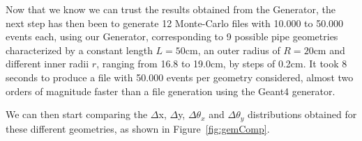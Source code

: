 \documentclass[a4paper, 11pt, twoside, openright]{report}
\begin{document}
Now that we know we can trust the results obtained from the Generator, the next step has then been to generate 12 Monte-Carlo files with 10.000 to 50.000 events each, using our Generator, corresponding to 9 possible pipe geometries characterized by a constant length $L = 50$cm, an outer radius of $R = 20$cm and different inner radii $r$, ranging from 16.8 to 19.0cm, by steps of 0.2cm. It took 8 seconds to produce a file with 50.000 events per geometry considered, almost two orders of magnitude faster than a file generation using the Geant4 generator.

We can then start comparing the $\Delta$x, $\Delta$y, $\Delta \theta_x$ and $\Delta \theta_y$ distributions obtained for these different geometries, as shown in Figure~\ref{fig:gemComp}.

\begin{figure}[htbp]
\centering
{}
\end{figure}
\end{document}
